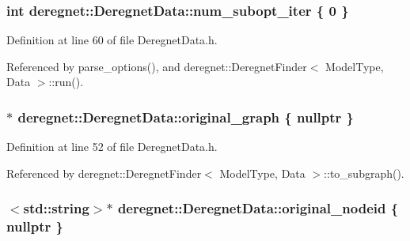 \subsubsection[{\texorpdfstring{num\+\_\+subopt\+\_\+iter}{num_subopt_iter}}]{\setlength{\rightskip}{0pt plus 5cm}int deregnet\+::\+Deregnet\+Data\+::num\+\_\+subopt\+\_\+iter \{ 0 \}}\hypertarget{classderegnet_1_1DeregnetData_adb7428cd99112156ae9f80187af9ebbe}{}\label{classderegnet_1_1DeregnetData_adb7428cd99112156ae9f80187af9ebbe}


Definition at line 60 of file Deregnet\+Data.\+h.



Referenced by parse\+\_\+options(), and deregnet\+::\+Deregnet\+Finder$<$ Model\+Type, Data $>$\+::run().

\subsubsection[{\texorpdfstring{original\+\_\+graph}{original_graph}}]{$\ast$ deregnet\+::\+Deregnet\+Data\+::original\+\_\+graph \{ nullptr \}}\hypertarget{classderegnet_1_1DeregnetData_a3ea2abe9900785d80fa0141afdd985a9}{}\label{classderegnet_1_1DeregnetData_a3ea2abe9900785d80fa0141afdd985a9}


Definition at line 52 of file Deregnet\+Data.\+h.



Referenced by deregnet\+::\+Deregnet\+Finder$<$ Model\+Type, Data $>$\+::to\+\_\+subgraph().

\subsubsection[{\texorpdfstring{original\+\_\+nodeid}{original_nodeid}}]{$<$std\+::string$>$$\ast$ deregnet\+::\+Deregnet\+Data\+::original\+\_\+nodeid \{ nullptr \}\hspace{0.3cm}{\ttfamily [private]}}\hypertarget{classderegnet_1_1DeregnetData_a6707f9bbc1ac5ccf78724e73cd8053b1}{}\label{classderegnet_1_1DeregnetData_a6707f9bbc1ac5ccf78724e73cd8053b1}


